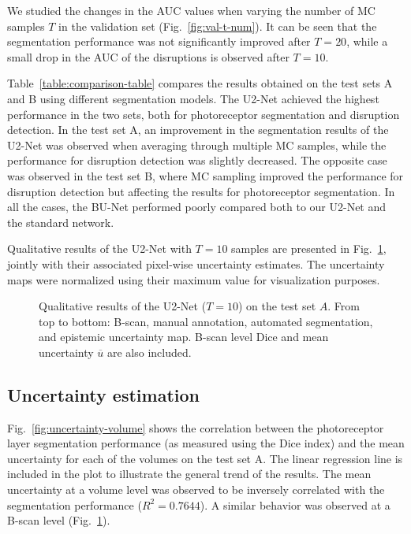 We studied the changes in the AUC values when varying the number of MC samples $T$ in the validation set (Fig.~\ref{fig:val-t-num}). It can be seen that the segmentation performance was not significantly improved after $T=20$, while a small drop in the AUC of the disruptions is observed after $T=10$. 

Table~\ref{table:comparison-table} compares the results obtained on the test sets A and B using different segmentation models. The U2-Net achieved the highest performance in the two sets, both for photoreceptor segmentation and disruption detection. In the test set A, an improvement in the segmentation results of the U2-Net was observed when averaging through multiple MC samples, while the performance for disruption detection was slightly decreased. The opposite case was observed in the test set B, where MC sampling improved the performance for disruption detection but affecting the results for photoreceptor segmentation. In all the cases, the BU-Net performed poorly compared both to our U2-Net and the standard network.

Qualitative results of the U2-Net with $T=10$ samples are presented in Fig.~\ref{fig:qualitative-results}, jointly with their associated pixel-wise uncertainty estimates. The uncertainty maps were normalized using their maximum value for visualization purposes.


\begin{figure}[t]
 \centering
{}
 \caption{Qualitative results of the U2-Net ($T=10$) on the test set $A$. From top to bottom: B-scan, manual annotation, automated segmentation, and epistemic uncertainty map. B-scan level Dice and mean uncertainty $\overline{u}$ are also included.}
 \label{fig:qualitative-results}
\end{figure}


\subsection{Uncertainty estimation}

Fig.~\ref{fig:uncertainty-volume} shows the correlation between the photoreceptor layer segmentation performance (as measured using the Dice index) and the mean uncertainty for each of the volumes on the test set A. The linear regression line is included in the plot to illustrate the general trend of the results. The mean uncertainty at a volume level was observed to be inversely correlated with the segmentation performance ($R^2=0.7644$). A similar behavior was observed at a B-scan level (Fig.~\ref{fig:qualitative-results}).




